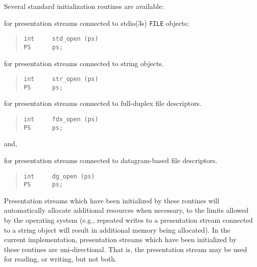 Several standard initialization routines are available:
\begin{describe}
\item[\verb"std\_open":]  for presentation streams connected to \man stdio(3s)
\verb"FILE" objects;
\begin{quote}\small\begin{verbatim}
int     std_open (ps)
PS      ps;
\end{verbatim}\end{quote}

\item[\verb"str\_open":] for presentation streams connected to string objects.
\begin{quote}\small\begin{verbatim}
int     str_open (ps)
PS      ps;
\end{verbatim}\end{quote}

\item[\verb"fdx\_open":] for presentation streams connected to full-duplex
file descriptors.
\begin{quote}\small\begin{verbatim}
int     fdx_open (ps)
PS      ps;
\end{verbatim}\end{quote}
and,

\item[\verb"dg\_open":] for presentation streams connected to datagram-based
file descriptors.
\begin{quote}\small\begin{verbatim}
int     dg_open (ps)
PS      ps;
\end{verbatim}\end{quote}
\end{describe}
Presentation streams which have been initialized by these routines will
automatically allocate additional resources when necessary,
to the limits allowed by the operating system
(e.g., repeated writes to a presentation stream connected to a string object
will result in additional memory being allocated).
In the current implementation,
presentation streams which have been initialized by these routines are
uni-directional.
That is,
the presentation stream may be used for reading, or writing, but not both.

